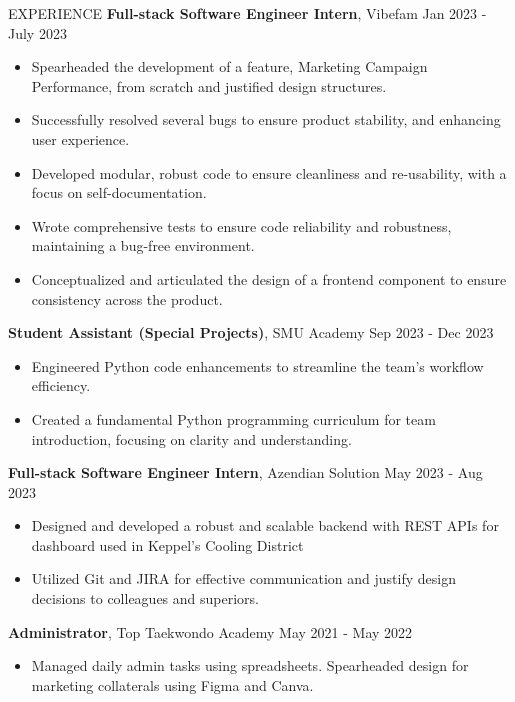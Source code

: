 \documentclass{resume} %
\begin{document}
\begin{rSection}{EXPERIENCE}
\textbf{Full-stack Software Engineer Intern}, Vibefam \hfill Jan 2023 - July 2023\\
 \vspace{-1.5em}
 \begin{itemize}
    \itemsep -5pt {} 
     \item {Spearheaded the development of a feature, Marketing Campaign Performance, from scratch and justified design structures.}
     \item {Successfully resolved several bugs to ensure product stability, and enhancing user experience.}
     \item {Developed modular, robust code to ensure cleanliness and re-usability, with a focus on self-documentation.}
     \item {Wrote comprehensive tests to ensure code reliability and robustness, maintaining a bug-free environment.}
     \item {Conceptualized and articulated the design of a frontend component to ensure consistency across the product.}
 \end{itemize}

\vspace{-0.25em}
\textbf{Student Assistant (Special Projects)}, SMU Academy \hfill Sep 2023 - Dec 2023\\
 \vspace{-1.5em}
 \begin{itemize}
    \itemsep -5pt {} 
     \item {Engineered Python code enhancements to streamline the team's workflow efficiency.}
     \item {Created a fundamental Python programming curriculum for team introduction, focusing on clarity and understanding.}
 \end{itemize}
 
\vspace{-0.25em}
\textbf{Full-stack Software Engineer Intern}, Azendian Solution \hfill May 2023 - Aug 2023\\
 \vspace{-1.5em}
 \begin{itemize}
    \itemsep -5pt {} 
     \item {Designed and developed a robust and scalable backend with REST APIs for dashboard used in Keppel's Cooling District}
     \item {Utilized Git and JIRA for effective communication and justify design decisions to colleagues and superiors.}
 \end{itemize}
 
\vspace{-0.25em}
\textbf{Administrator}, Top Taekwondo Academy \hfill May 2021 - May 2022\\
 \vspace{-1.5em}
 \begin{itemize}
    \itemsep -5pt {} 
     \item {Managed daily admin tasks using spreadsheets. Spearheaded design for marketing collaterals using Figma and Canva.}
 \end{itemize}

\end{rSection} 
\end{document}
